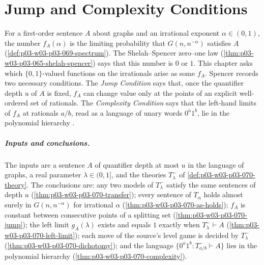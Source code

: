 \chapter{Jump and Complexity Conditions}
\label{sec:p03-w03-p03-070}

For a first-order sentence \(A\) about graphs and an irrational exponent
\(\alpha\in(0,1)\), the number \(f_A(\alpha)\) is the limiting probability that
\(G(n,n^{-\alpha})\) satisfies \(A\)
(\cref{def:p03-w03-p03-069-spectrum}).  The Shelah--Spencer zero--one law
(\cref{thm:p03-w03-p03-065-shelah-spencer}) says that this number is \(0\) or
\(1\).  This chapter asks which \(\{0,1\}\)-valued functions on the
irrationals arise as some \(f_A\).  Spencer records two necessary conditions.
The \emph{Jump Condition} says that, once the quantifier depth \(u\) of \(A\)
is fixed, \(f_A\) can change value only at the points of an explicit
well-ordered set of rationals.  The \emph{Complexity Condition} says that the
left-hand limits of \(f_A\) at rationals \(a/b\), read as a language of unary
words \(0^a1^b\), lie in the polynomial hierarchy
\cite[pp.~18--21]{Spencer2007LogicRandomStructuresAuthor}.

\paragraph{Inputs and conclusions.}
The inputs are a sentence \(A\) of quantifier depth at most \(u\) in the
language of graphs, a real parameter \(\lambda\in(0,1]\), and the theories
\(T^-_\lambda\) of \cref{def:p03-w03-p03-070-theory}.  The conclusions are:
any two models of \(T^-_\lambda\) satisfy the same sentences of depth \(u\)
(\cref{thm:p03-w03-p03-070-transfer}); every sentence of \(T_\alpha\)
holds almost surely in \(G(n,n^{-\alpha})\) for irrational \(\alpha\)
(\cref{thm:p03-w03-p03-070-as-holds}); \(f_A\) is constant between
consecutive points of a splitting set (\cref{thm:p03-w03-p03-070-jump}); the
left limit \(g_A(\lambda)\) exists and equals \(1\) exactly when
\(T^-_\lambda\vdash A\) (\cref{thm:p03-w03-p03-070-left-limit}); each move
of the source's level game is decided by \(T^-_\lambda\)
(\cref{thm:p03-w03-p03-070-dichotomy}); and the
language \(\{0^a1^b:T^-_{a/b}\vdash A\}\) lies in the polynomial hierarchy
(\cref{thm:p03-w03-p03-070-complexity}).

